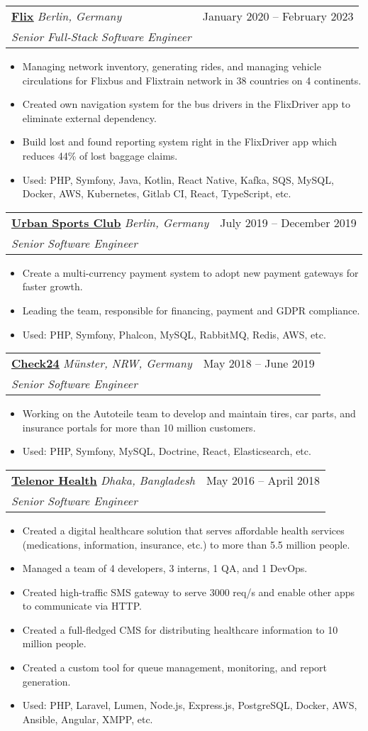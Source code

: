 \documentclass[a4paper,11pt]{article}
\makeatletter
\newcommand{\resumeItem}[1]{
  \item\small{
    {#1 \vspace{-2pt}}
  }
}
\newcommand{\resumeSubheading}[4]{
  \vspace{-2pt}\item
    \begin{tabular*}{0.97\textwidth}[t]{l@{\extracolsep{\fill}}r}
      \textbf{\large #1} \small{\textit{#4}} & #2 \\
      \textit{#3}
    \end{tabular*}\vspace{-7pt}
}
\newcommand{\resumeSubSubheading}[2]{
    \item
    \begin{tabular*}{0.97\textwidth}{l@{\extracolsep{\fill}}r}
      \textit{\small#1} & \textit{\small #2} \\
    \end{tabular*}\vspace{-7pt}
}
\newcommand{\resumeSubHeadingListEnd}{\end{itemize}}
\newcommand{\resumeItemListStart}{\begin{itemize}}
\newcommand{\resumeItemListEnd}{\end{itemize}\vspace{-5pt}}
\makeatother
\begin{document}
    \resumeSubheading
      {\href{https://flix.com}{\underline{Flix}}} {January 2020 -- February 2023}
      {Senior Full-Stack Software Engineer}{Berlin, Germany}
      \resumeItemListStart
        \resumeItem{Managing network inventory, generating rides, and managing vehicle circulations for Flixbus and Flixtrain network in 38 countries on 4 continents.}
        \resumeItem{Created own navigation system for the bus drivers in the FlixDriver app to eliminate external dependency.}
        \resumeItem{Build lost and found reporting system right in the FlixDriver app which reduces 44\% of lost baggage claims.}
        \resumeItem{Used: PHP, Symfony, Java, Kotlin, React Native, Kafka, SQS, MySQL, Docker, AWS, Kubernetes, Gitlab CI, React, TypeScript, etc.}
      \resumeItemListEnd
      

    \resumeSubheading
      {\href{https://urbansportsclub.com}{\underline{Urban Sports Club}}}{July 2019 -- December 2019}
      {Senior Software Engineer}{Berlin, Germany}
      \resumeItemListStart
        \resumeItem{Create a multi-currency payment system to adopt new payment gateways for faster growth.}
        \resumeItem{Leading the team, responsible for financing, payment and GDPR compliance.}
        \resumeItem{Used: PHP, Symfony, Phalcon, MySQL, RabbitMQ, Redis, AWS, etc.}
    \resumeItemListEnd

    \resumeSubheading
      {\href{http://check24.de}{\underline{Check24}}}{May 2018 -- June 2019}
      {Senior Software Engineer}{Münster, NRW, Germany}
      \resumeItemListStart
        \resumeItem{Working on the Autoteile team to develop and maintain tires, car parts, and insurance portals for more than 10 million customers.}
        \resumeItem{Used: PHP, Symfony, MySQL, Doctrine, React, Elasticsearch, etc.}
      \resumeItemListEnd
      
    \resumeSubheading
      {\href{https://telenorhealth.com}{\underline{Telenor Health}}}{May 2016 -- April 2018}
      {Senior Software Engineer}{Dhaka, Bangladesh}
      \resumeItemListStart
        \resumeItem{Created a digital healthcare solution that serves affordable health services (medications, information, insurance, etc.) to more than 5.5 million people.}
        \resumeItem{Managed a team of 4 developers, 3 interns, 1 QA, and 1 DevOps.}
        \resumeItem{Created high-traffic SMS gateway to serve 3000 req/s and enable other apps to communicate via HTTP.}
        \resumeItem{Created a full-fledged CMS for distributing healthcare information to 10 million people.}
        \resumeItem{Created a custom tool for queue management, monitoring, and report generation.}
        \resumeItem{Used: PHP, Laravel, Lumen, Node.js, Express.js, PostgreSQL, Docker, AWS, Ansible, Angular, XMPP, etc.}
      \resumeItemListEnd
      
\end{document}
